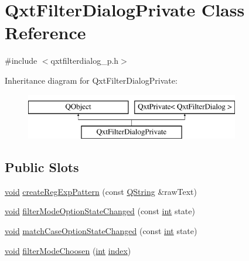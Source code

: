 \hypertarget{class_qxt_filter_dialog_private}{\section{Qxt\-Filter\-Dialog\-Private Class Reference}
\label{class_qxt_filter_dialog_private}
}


{\ttfamily \#include $<$qxtfilterdialog\-\_\-p.\-h$>$}

Inheritance diagram for Qxt\-Filter\-Dialog\-Private\-:\begin{figure}[H]
\begin{center}
\leavevmode
\includegraphics[height=2.000000cm]{class_qxt_filter_dialog_private}
\end{center}
\end{figure}
\subsection*{Public Slots}
\begin{DoxyCompactItemize}
\item 
\hyperlink{group___u_a_v_objects_plugin_ga444cf2ff3f0ecbe028adce838d373f5c}{void} \hyperlink{class_qxt_filter_dialog_private_ad47742a73218e2ef5f9010c4a0d72acf}{create\-Reg\-Exp\-Pattern} (const \hyperlink{group___u_a_v_objects_plugin_gab9d252f49c333c94a72f97ce3105a32d}{Q\-String} \&raw\-Text)
\item 
\hyperlink{group___u_a_v_objects_plugin_ga444cf2ff3f0ecbe028adce838d373f5c}{void} \hyperlink{class_qxt_filter_dialog_private_a13b2cde3589160d35c000399fa91ddd6}{filter\-Mode\-Option\-State\-Changed} (const \hyperlink{ioapi_8h_a787fa3cf048117ba7123753c1e74fcd6}{int} state)
\item 
\hyperlink{group___u_a_v_objects_plugin_ga444cf2ff3f0ecbe028adce838d373f5c}{void} \hyperlink{class_qxt_filter_dialog_private_aafddae2ac931fe31bf697e1ec3e1229d}{match\-Case\-Option\-State\-Changed} (const \hyperlink{ioapi_8h_a787fa3cf048117ba7123753c1e74fcd6}{int} state)
\item 
\hyperlink{group___u_a_v_objects_plugin_ga444cf2ff3f0ecbe028adce838d373f5c}{void} \hyperlink{class_qxt_filter_dialog_private_ace9a1c8ee3750b85cb93275d6d5d31bc}{filter\-Mode\-Choosen} (\hyperlink{ioapi_8h_a787fa3cf048117ba7123753c1e74fcd6}{int} \hyperlink{glext_8h_ab47dd9958bcadea08866b42bf358e95e}{index})
\end{DoxyCompactItemize}

